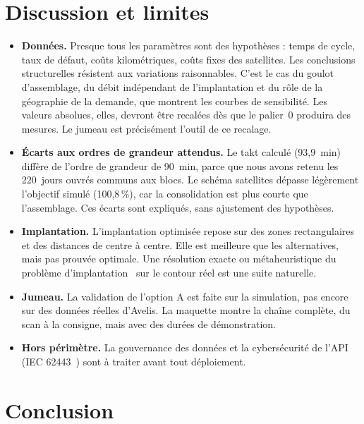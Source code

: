 \documentclass[11pt,a4paper]{article}
\begin{document}
\section{Discussion et limites}\label{sec:discussion}

\begin{itemize}
\item \textbf{Données.} Presque tous les paramètres sont des hypothèses : temps de cycle, taux de
défaut, coûts kilométriques, coûts fixes des satellites. Les conclusions structurelles résistent
aux variations raisonnables. C'est le cas du goulot d'assemblage, du débit indépendant de
l'implantation et du rôle de la géographie de la demande, que montrent les courbes de sensibilité.
Les valeurs absolues, elles, devront être recalées dès que le palier~0 produira des mesures.
Le jumeau est précisément l'outil de ce recalage.
\item \textbf{Écarts aux ordres de grandeur attendus.} Le takt calculé (93,9~min) diffère de
l'ordre de grandeur de 90~min, parce que nous avons retenu les 220~jours ouvrés communs aux
blocs. Le schéma satellites dépasse légèrement l'objectif simulé (100,8\,\%), car la
consolidation est plus courte que l'assemblage. Ces écarts sont expliqués, sans ajustement des
hypothèses.
\item \textbf{Implantation.} L'implantation optimisée repose sur des zones rectangulaires et des
distances de centre à centre. Elle est meilleure que les alternatives, mais pas prouvée optimale.
Une résolution exacte ou métaheuristique du problème d'implantation~\cite{drira2007} sur le
contour réel est une suite naturelle.
\item \textbf{Jumeau.} La validation de l'option A est faite sur la simulation, pas encore sur des
données réelles d'Avelis. La maquette montre la chaîne complète, du scan à la consigne, mais
avec des durées de démonstration.
\item \textbf{Hors périmètre.} La gouvernance des données et la cybersécurité de l'API (IEC
62443~\cite{iec62443}) sont à traiter avant tout déploiement.
\end{itemize}

\section{Conclusion}
\end{document}
